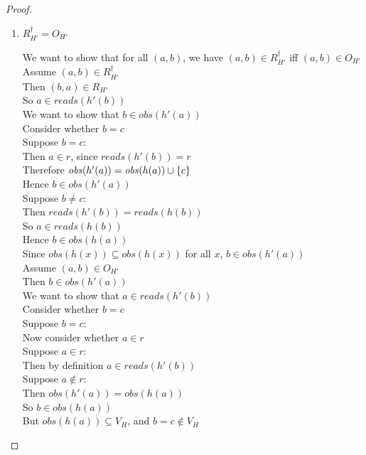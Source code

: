 \begin{proof}
\begin{enumerate}
\item $R^\dagger_{H'} = O_{H'}$ 
  \begin{tabbedproof}
    \oo We want to show that for all $(a,b)$, we have $(a,b) \in R^\dagger_{H'}$ iff $(a,b) \in O_{H'}$ \\
    \oo Assume $(a,b) \in R^\dagger_{H'}$ \\
    \ooo Then $(b, a) \in R_{H'}$ \\
    \ooo So $a \in \mathit{reads}(h'(b))$ \\
    \ooo We want to show that $b \in \mathit{obs}(h'(a))$ \\
    \ooo Consider whether $b = c$ \\
    \ooo Suppose $b = c$: \\
    \oooo Then $a \in r$, since $\mathit{reads}(h'(b)) = r$ \\
    \oooo Therefore $\mathit{obs}(h'(a)) = \mathit{obs}(h(a)) \cup \{{c}\}$ \\
    \oooo Hence $b \in \mathit{obs}(h'(a))$ \\
    \ooo Suppose $b \not= c$: \\
    \oooo Then $\mathit{reads}(h'(b)) = \mathit{reads}(h(b))$ \\
    \oooo So $a \in \mathit{reads}(h(b))$ \\
    \oooo Hence $b \in \mathit{obs}(h(a))$ \\
    \oooo Since $\mathit{obs}(h(x)) \subseteq \mathit{obs}(h(x))$ for all $x$, $b \in \mathit{obs}(h'(a))$ \\
    \oo Assume $(a,b) \in O_{H'}$ \\
    \ooo Then $b \in \mathit{obs}(h'(a))$ \\
    \ooo We want to show that $a \in \mathit{reads}(h'(b))$ \\
    \ooo Consider whether $b = c$ \\
    \ooo Suppose $b = c$: \\
    \oooo Now consider whether $a \in r$ \\
    \oooo Suppose $a \in r$: \\
    \ooooo Then by definition $a \in \mathit{reads}(h'(b))$ \\
    \oooo Suppose $a \not\in r$: \\
    \ooooo Then $\mathit{obs}(h'(a)) = \mathit{obs}(h(a))$ \\
    \ooooo So $b \in \mathit{obs}(h(a))$ \\
    \ooooo But $\mathit{obs}(h(a)) \subseteq V_H$, and $b = c \not\in V_H$ \\

\end{tabbedproof}
\end{enumerate}
\end{proof}
